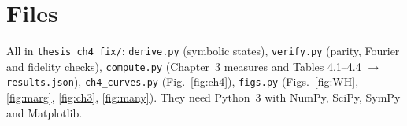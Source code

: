 \documentclass[11pt,a4paper]{article}
\begin{document}
\section{Files}
\label{app:files}
All in \texttt{thesis\_ch4\_fix/}:
\texttt{derive.py} (symbolic states), \texttt{verify.py} (parity, Fourier and fidelity checks),
\texttt{compute.py} (Chapter~3 measures and Tables 4.1--4.4 $\to$ \texttt{results.json}),
\texttt{ch4\_curves.py} (Fig.~\ref{fig:ch4}), \texttt{figs.py} (Figs.~\ref{fig:WH}, \ref{fig:marg},
\ref{fig:ch3}, \ref{fig:many}). They need Python~3 with NumPy, SciPy, SymPy and Matplotlib.
\end{document}
